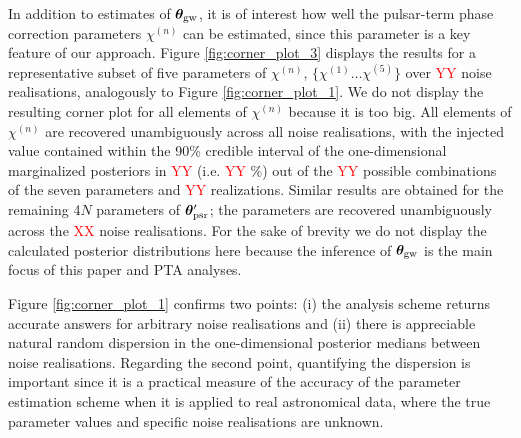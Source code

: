 \documentclass[fleqn,usenatbib,useAMS]{mnras}
\begin{document}
In addition to estimates of $\boldsymbol{\theta}_{\rm gw}$, it is of interest how well the pulsar-term phase correction parameters $\chi^{(n)}$ can be estimated, since this parameter is a key feature of our approach. Figure \ref{fig:corner_plot_3} displays the results for a representative subset of five parameters of $\chi^{(n)}$, $ \{\chi^{(1)} \dots \chi^{(5)} \}$ over \textcolor{red}{YY} noise realisations, analogously to Figure \ref{fig:corner_plot_1}. We do not display the resulting corner plot for all elements of $\chi^{(n)}$ because it is too big. All elements of $\chi^{(n)}$ are recovered unambiguously across all noise realisations, with the injected value contained within the 90\% credible interval of the one-dimensional marginalized posteriors in \textcolor{red}{YY} (i.e. \textcolor{red}{YY} $\%$) out of the \textcolor{red}{YY} possible combinations of the seven parameters and \textcolor{red}{YY} realizations. Similar results are obtained for the remaining 4$N$ parameters of $\boldsymbol{\theta}_{\rm psr}'$; the parameters are recovered unambiguously across the \textcolor{red}{XX} noise realisations. For the sake of brevity we do not display the calculated posterior distributions here because the inference of $\boldsymbol{\theta}_{\rm gw}$ is the main focus of this paper and PTA analyses. \newline 


Figure \ref{fig:corner_plot_1} confirms two points: (i) the analysis scheme returns accurate answers for arbitrary noise realisations and (ii) there is appreciable natural random dispersion in the one-dimensional posterior medians between noise realisations. Regarding the second point, quantifying the dispersion is important since it is a practical measure of the accuracy of the parameter estimation scheme when it is applied to real astronomical data, where the true parameter values and specific noise realisations are unknown. \newline 
  
\end{document}
